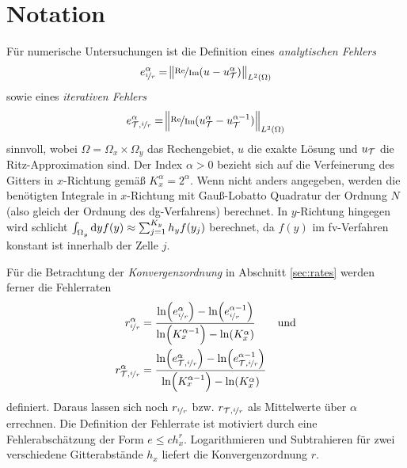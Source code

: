 \section{Notation}\label{sec:notation_4}
Für numerische Untersuchungen ist die Definition eines \emph{analytischen Fehlers} 
\begin{equation}
  e_{\nicefrac{i}{r}}^{\alpha} = \norm{\nicefrac{\operatorname{Re}}{\operatorname{Im}} (u - u_{\mathcal{T}}^{\alpha})}_{L^2(\Omega)}
  \label{eq:error_ana}
\end{equation}
sowie eines \emph{iterativen Fehlers}
\begin{equation*}
  e_{\mathcal{T}, \nicefrac{i}{r}}^{\alpha} = \norm{\nicefrac{\operatorname{Re}}{\operatorname{Im}} (u_{\mathcal{T}}^{\alpha} - u_{\mathcal{T}}^{\alpha-1})}_{L^2(\Omega)}
\end{equation*}
sinnvoll, wobei $\Omega=\Omega_x \times \Omega_y$ das Rechengebiet, $u$ die exakte Lösung und $u_{\mathcal{T}}$ die Ritz-Approximation sind. Der Index $\alpha>0$ bezieht sich auf die Verfeinerung des Gitters in $x$-Richtung gemäß $K_x^{\alpha} = 2^\alpha$. Wenn nicht anders angegeben, werden die benötigten Integrale in $x$-Richtung mit Gauß-Lobatto Quadratur der Ordnung $N$ (also gleich der Ordnung des \ac{dg}-Verfahrens) berechnet.
In $y$-Richtung hingegen wird schlicht $\int_{\Omega_y}\mathop{}\!\mathrm{d} y f(y) \approx \sum_{j=1}^{K_y} h_y f(y_j)$ berechnet, da $f(y)$ im \ac{fv}-Verfahren konstant ist innerhalb der Zelle $j$.

Für die Betrachtung der \emph{Konvergenzordnung} in Abschnitt \ref{sec:rates} werden ferner die Fehlerraten
\begin{equation}
  \begin{aligned}
    r_{\nicefrac{i}{r}}^{\alpha} &= \frac{\ln(e_{\nicefrac{i}{r}}^{\alpha}) - \ln(e_{\nicefrac{i}{r}}^{\alpha-1})}{\ln(K_x^{\alpha-1}) - \ln(K_x^{\alpha})} \qquad\text{und}\\
    r_{\mathcal{T},\nicefrac{i}{r}}^{\alpha} &= \frac{\ln(e_{\mathcal{T},\nicefrac{i}{r}}^{\alpha}) - \ln(e_{\mathcal{T},\nicefrac{i}{r}}^{\alpha-1})}{\ln(K_x^{\alpha-1}) - \ln(K_x^{\alpha})}
  \end{aligned}
  \label{eq:fehlerraten}
\end{equation}
definiert. Daraus lassen sich noch $r_{\nicefrac{i}{r}}$ bzw. $r_{\mathcal{T},\nicefrac{i}{r}}$ als Mittelwerte über $\alpha$ errechnen. Die Definition der Fehlerrate ist motiviert durch eine Fehlerabschätzung der Form $e \leq ch_x^r$. Logarithmieren und Subtrahieren für zwei verschiedene Gitterabstände $h_x$ liefert die Konvergenzordnung $r$.

